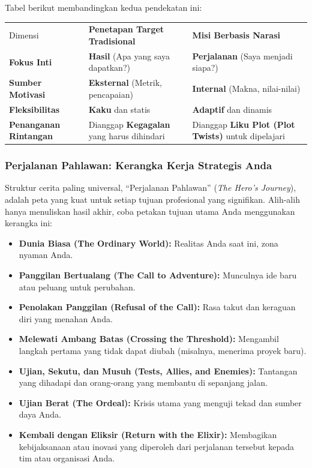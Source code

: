 \documentclass[
  letterpaper,
  DIV=11,
  numbers=noendperiod]{scrreprt}
\begin{document}
Tabel berikut membandingkan kedua pendekatan ini:

\begin{longtable}[]{@{}
  >{\raggedright\arraybackslash}p{}
  >{\raggedright\arraybackslash}p{}
  >{\raggedright\arraybackslash}p{}@{}}
\toprule\noalign{}
\endhead
\bottomrule\noalign{}
\endlastfoot
Dimensi & \textbf{Penetapan Target Tradisional} & \textbf{Misi Berbasis
Narasi} \\
\textbf{Fokus Inti} & \textbf{Hasil} (Apa yang saya dapatkan?) &
\textbf{Perjalanan} (Saya menjadi siapa?) \\
\textbf{Sumber Motivasi} & \textbf{Eksternal} (Metrik, pencapaian) &
\textbf{Internal} (Makna, nilai-nilai) \\
\textbf{Fleksibilitas} & \textbf{Kaku} dan statis & \textbf{Adaptif} dan
dinamis \\
\textbf{Penanganan Rintangan} & Dianggap \textbf{Kegagalan} yang harus
dihindari & Dianggap \textbf{Liku Plot (Plot Twists)} untuk
dipelajari \\
\end{longtable}

\subsubsection{Perjalanan Pahlawan: Kerangka Kerja Strategis
Anda}\label{perjalanan-pahlawan-kerangka-kerja-strategis-anda}

Struktur cerita paling universal, ``Perjalanan Pahlawan'' (\emph{The
Hero's Journey}), adalah peta yang kuat untuk setiap tujuan profesional
yang signifikan. Alih-alih hanya menuliskan hasil akhir, coba petakan
tujuan utama Anda menggunakan kerangka ini:

\begin{itemize}
\item
  \textbf{Dunia Biasa (The Ordinary World):} Realitas Anda saat ini,
  zona nyaman Anda.
\item
  \textbf{Panggilan Bertualang (The Call to Adventure):} Munculnya ide
  baru atau peluang untuk perubahan.
\item
  \textbf{Penolakan Panggilan (Refusal of the Call):} Rasa takut dan
  keraguan diri yang menahan Anda.
\item
  \textbf{Melewati Ambang Batas (Crossing the Threshold):} Mengambil
  langkah pertama yang tidak dapat diubah (misalnya, menerima proyek
  baru).
\item
  \textbf{Ujian, Sekutu, dan Musuh (Tests, Allies, and Enemies):}
  Tantangan yang dihadapi dan orang-orang yang membantu di sepanjang
  jalan.
\item
  \textbf{Ujian Berat (The Ordeal):} Krisis utama yang menguji tekad dan
  sumber daya Anda.
\item
  \textbf{Kembali dengan Eliksir (Return with the Elixir):} Membagikan
  kebijaksanaan atau inovasi yang diperoleh dari perjalanan tersebut
  kepada tim atau organisasi Anda.
\end{itemize}
\end{document}
